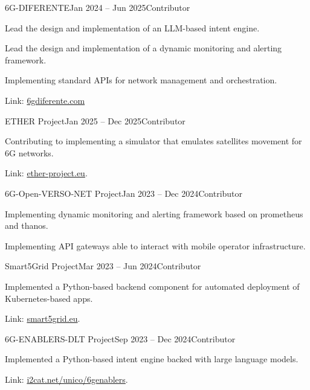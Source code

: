 \documentclass{resume}
\begin{document}
\begin{content}
    \begin{position}{6G-DIFERENTE}{Jan 2024 -- Jun 2025}{Contributor}{}{}
        \item Lead the design and implementation of an LLM-based intent engine.
        \item Lead the design and implementation of a dynamic monitoring and alerting framework.
        \item Implementing standard APIs for network management and orchestration.
        \item Link: \href{https://6gdiferente.com}{6gdiferente.com}
    \end{position}

    \begin{position}{ETHER Project}{Jan 2025 -- Dec 2025}{Contributor}{}{} %
        \item Contributing to implementing a simulator that emulates satellites movement for 6G networks.
        \item Link: \href{https://ether-project.eu/}{ether-project.eu}.
    \end{position}

    \begin{position}{6G-Open-VERSO-NET Project}{Jan 2023 -- Dec 2024}{Contributor}{}{} %
        \item Implementing dynamic monitoring and alerting framework based on prometheus and thanos.
        \item Implementing API gateways able to interact with mobile operator infrastructure.
    \end{position}

    \begin{position}{Smart5Grid Project}{Mar 2023 -- Jun 2024}{Contributor}{}{} %
        \item Implemented a Python-based backend component for automated deployment of Kubernetes-based apps.
        \item Link: \href{https://smart5grid.eu/}{smart5grid.eu}.
    \end{position}

     \begin{position}{6G-ENABLERS-DLT Project}{Sep 2023 -- Dec 2024}{Contributor}{}{} %
        \item Implemented a Python-based intent engine backed with large language models.
        \item Link: \href{https://i2cat.net/unico/6genablers/}{i2cat.net/unico/6genablers}.
    \end{position}


\end{content}
\end{document}
